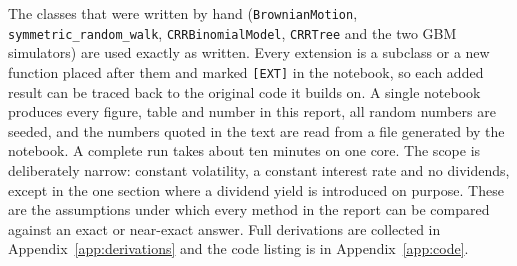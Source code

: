 The classes that were written by hand (\texttt{BrownianMotion}, \texttt{symmetric\_random\_walk}, \texttt{CRRBinomialModel}, \texttt{CRRTree} and the two GBM simulators) are used exactly as written.
Every extension is a subclass or a new function placed after them and marked \texttt{[EXT]} in the notebook, so each added result can be traced back to the original code it builds on.
A single notebook produces every figure, table and number in this report, all random numbers are seeded, and the numbers quoted in the text are read from a file generated by the notebook.
A complete run takes about ten minutes on one core.
The scope is deliberately narrow: constant volatility, a constant interest rate and no dividends, except in the one section where a dividend yield is introduced on purpose.
These are the assumptions under which every method in the report can be compared against an exact or near-exact answer.
Full derivations are collected in Appendix~\ref{app:derivations} and the code listing is in Appendix~\ref{app:code}.
